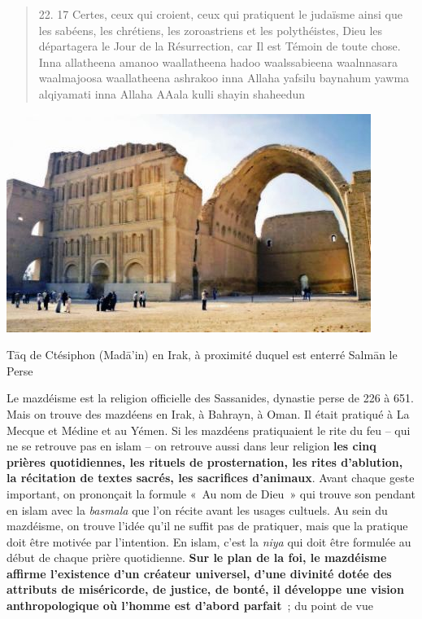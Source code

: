 \begin{quote}
{22. 17 }
{Certes, ceux qui croient, ceux qui pratiquent le judaïsme
ainsi que les sabéens, les chrétiens, les zoroastriens et les
polythéistes, Dieu les départagera le Jour de la Résurrection, car Il
est Témoin de toute
chose.}
{Inna allatheena amanoo waallatheena hadoo
waalssabieena waalnnasara waalmajoosa waallatheena ashrakoo inna Allaha
yafsilu baynahum yawma alqiyamati inna Allaha AAala kulli shayin
shaheedun
}
\end{quote}
\begin{marginfigure}
    \centering
\includegraphics[width=\textwidth]{Images/image034.jpg}
    \caption{Tāq de Ctésiphon (Madā'in) en
Irak, à proximité duquel est enterré Salmān le
Perse}
    \label{fig:Ctesiphon}
\end{marginfigure}
Le mazdéisme est la religion officielle des Sassanides, dynastie perse
de 226 à 651. Mais on trouve des mazdéens en Irak, à Bahrayn, à Oman. Il
était pratiqué à La Mecque et Médine et au Yémen. Si les mazdéens
pratiquaient le rite du feu -- qui ne se retrouve pas en islam -- on
retrouve aussi dans leur religion \textbf{les cinq prières quotidiennes,
les rituels de prosternation, les rites d'ablution, la récitation de
textes sacrés, les sacrifices d'animaux}. Avant chaque geste important,
on prononçait la formule «~Au nom de Dieu~» qui trouve son pendant en
islam avec la \emph{basmala} que l'on récite avant les usages cultuels.
Au sein du mazdéisme, on trouve l'idée qu'il ne suffit pas de pratiquer,
mais que la pratique doit être motivée par l'intention. En islam, c'est
la \emph{niya} qui doit être formulée au début de chaque prière
quotidienne. \textbf{Sur le plan de la foi, le mazdéisme affirme
l'existence d'un créateur universel, d'une divinité dotée des attributs
de miséricorde, de justice, de bonté, il développe une vision
anthropologique où l'homme est d'abord parfait}~; du point de vue
